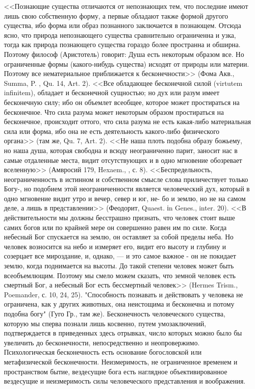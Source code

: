 \documentclass[12pt,oneside]{book}
\newcommand{\rom}[1]{\uppercase\expandafter{\romannumeral #1\relax}}
\begin{document}
\bigskip

<<Познающие существа отличаются от непознающих тем, что последние имеют лишь свою собственную форму, а первые обладают также формой другого существа, ибо форма или образ познанного заключается в познающем. Отсюда ясно, что природа непознающего существа сравнительно ограниченна и узка, тогда как природа познающего существа гораздо более пространна и обширна. Поэтому философ (Аристотель) говорит: Душа есть некоторым образом все. Но ограниченные формы (какого-нибудь существа) исходят от природы или материи. Поэтому все нематериальное приближается к бесконечности>> (Фома Акв., Summa, P. \rom{1}, Qu. 14, Art. 2). <<Все обладающее бесконечной силой (virtutem infinitem), обладает и бесконечной сущностью; но дух или разум имеет бесконечную силу; ибо он объемлет всеобщее, которое может простираться на бесконечное. Что сила разума может некоторым образом простираться на бесконечное, происходит оттого, что сила разума не есть какая-либо материальная сила или форма, ибо она не есть деятельность какого-либо физического органа>> (там же, Qu. 7, Art. 2). <<Не наша плоть подобна образу божьему, но наша душа, которая свободна и всюду неограниченно парит, заносит нас в самые отдаленные места, видит отсутствующих и в одно мгновение обозревает вселенную>> (Амвросий 179, Hexaem., \rom{6}, с. 8). <<Беспредельность, неограниченность в истинном и собственном смысле слова приличествует только Богу-, но подобием этой неограниченности является человеческий дух, который в одно мгновение видит утро и вечер, север и юг, не- бо и землю, но не на самом деле, а лишь в представлении>> (Феодорит, Quaest. іn Genes., inter. 20). <<В действительности мы должны бесстрашно признать, что человек стоит выше самих богов или по крайней мере он совершенно равен им по силе. Когда небесный Бог спускается на землю, он оставляет за собой пределы неба. Но человек возносится на небо и измеряет его, видит его высоту и глубину и созерцает все мироздание, и, однако, --- и это самое важное - он не покидает землю, когда поднимается на высоты. До такой степени человек может быть всеобъемлющим. Поэтому мы смело можем сказать, что земной человек есть смертный Бог, а небесный Бог есть бессмертный человек>> (Hermes Trism., Poemander, с. 10, 24, 25). "Способность познавать и действовать у человека не ограничена, как у других животных, она неистощима и бесконечна и потому подобна богу" (Гуго Гр., там же). Бесконечность человеческого существа, которую мы сперва познали лишь косвенно, путем умозаключений, подтверждается в приведенных здесь отрывках, число которых можно было бы увеличить до бесконечности, непосредственно и неопровержимо. Психологическая бесконечность есть основание богословской или метафизической бесконечности. Неизмеримость, не ограниченное временем и пространством бытие, вездесущие бога есть наглядное объективированное вездесущие и неизмеримость силы человеческого представления и воображения.
\end{document}

